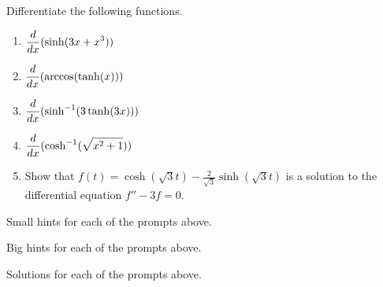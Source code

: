 \begin{activity} \label{A:6.8.2} Differentiate the following functions.
\begin{enumerate}[1)]
\item $\displaystyle \frac{d}{dx}( \sinh(3x+x^3) )  $
\item $\displaystyle \frac{d}{dx}( \arccos( \tanh(x) ) ) $
\item $\displaystyle \frac{d}{dx}( \sinh^{-1} (3 \tanh (3x)) ) $
\item $\displaystyle \frac{d}{dx}( \cosh^{-1}(\sqrt{x^2+1})  ) $
\item Show that $f(t) = \cosh(\sqrt{3}t) - \frac{2}{\sqrt{3}}\sinh(\sqrt{3}t)$ is a solution to the differential equation $f''-3f=0$.  
\end{enumerate}
\end{activity}
\begin{smallhint}
\ba
	\item Small hints for each of the prompts above.
\ea
\end{smallhint}
\begin{bighint}
\ba
	\item Big hints for each of the prompts above.
\ea
\end{bighint}
\begin{activitySolution}
\ba
	\item Solutions for each of the prompts above.
\ea
\end{activitySolution}
\aftera